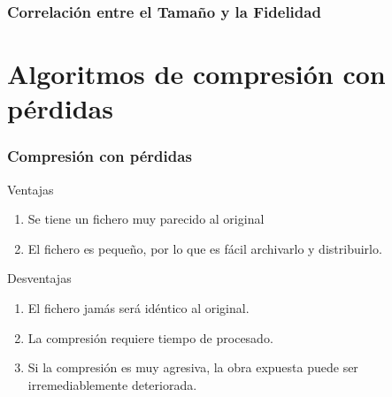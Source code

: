 \documentclass{beamer}
\begin{document}
\begin{frame}
    \frametitle{Correlación entre el Tamaño y la Fidelidad}
    \centering
\end{frame}

\section{Algoritmos de compresión con pérdidas}
\begin{frame}
    \frametitle{Compresión con pérdidas}
   \centering
    \begin{exampleblock}{Ventajas}
        \begin{enumerate}
            \item Se tiene un fichero muy parecido al original
            \item El fichero es pequeño, por lo que es fácil archivarlo y distribuirlo.
        \end{enumerate}
    \end{exampleblock}
    \begin{block}{Desventajas}
        \begin{enumerate}
            \item El fichero jamás será idéntico al original.
            \item La compresión requiere tiempo de procesado.
            \item Si la compresión es muy agresiva, la obra expuesta puede ser irremediablemente deteriorada.
        \end{enumerate}
    \end{block}
\end{frame}
\end{document}
